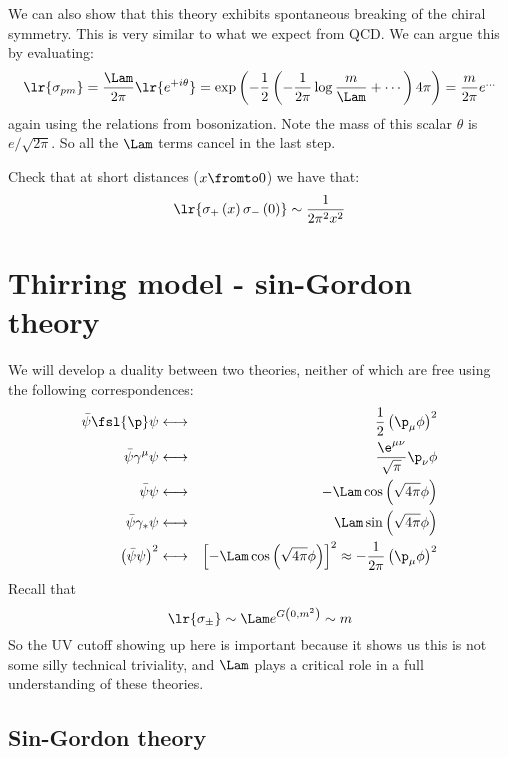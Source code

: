 \documentclass{booc}
\begin{document}
We can also show that this theory exhibits spontaneous breaking of the chiral symmetry.
This is very similar to what we expect from QCD.
We can argue this by evaluating:
\begin{eqnarray}
\lr{\sigma_{pm}} = 
\frac{\Lam}{2\pi}
\lr{
e^{+ i\theta}
}=\exp\left( 
-\frac{1}{2} \left( -\frac{1}{2\pi} \log \frac{m}{\Lam} + \cdots\right) 
4\pi
\right)=
\frac{m}{2\pi}
e^{\ldots}
\end{eqnarray}
again using the relations from bosonization.
Note the mass of this scalar $\theta$ is
$e / \sqrt{2\pi}$.
So all the $\Lam$ terms cancel in the last step.
\begin{exr}
Check that at short distances ($x\fromto 0$)
we have that:
\begin{equation}
\lr{\sigma_+\left( x \right) \sigma_-\left( 0 \right)} \sim \frac{1}{2\pi^2 x^2}
\end{equation}
\end{exr}

\section{Thirring model - sin-Gordon theory}

We will develop a duality between two theories, neither of which are free
using the following correspondences:
\begin{eqnarray}
\bar \psi \fsl{\p}\psi
&\longleftrightarrow &
\frac{1}{2}\left( \p_\mu \phi \right)^2 
\\
\bar \psi \gamma^\mu \psi 
&\longleftrightarrow &
\frac{\e^{\mu\nu}}{\sqrt{\pi}} \p_\nu \phi
\\
\bar \psi \psi 
&\longleftrightarrow &
-\Lam \cos\left( \sqrt{4\pi} \phi \right)
\\
\bar \psi \gamma_* \psi
&\longleftrightarrow &
\Lam \sin\left( \sqrt{4\pi} \phi \right)
\\
\left( \bar \psi \psi \right)^2 
&\longleftrightarrow &
\left[ -\Lam \cos\left( \sqrt{4\pi} \phi \right) \right]^2 \approx
-\frac{1}{2\pi} \left( \p_\mu \phi \right)^2
\end{eqnarray}
Recall that
\begin{equation}
\lr{\sigma_{\pm}} \sim
\Lam e^{G\left( 0 , m^2 \right)} \sim m
\end{equation}
So the UV cutoff showing up here is important because it shows us
this is not some silly technical triviality, and $\Lam$ plays a critical role
in a full understanding of these theories.

\subsection{Sin-Gordon theory}
\end{document}

